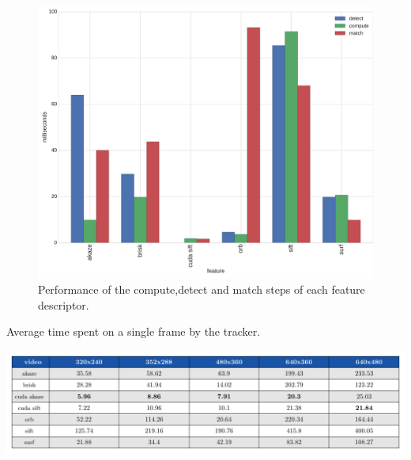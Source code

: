\begin{figure}
	\includegraphics[width=0.95\linewidth]{imgs/performances.pdf}
\vspace{-2.5mm}	
\caption{Performance of the compute,detect and match steps of each feature descriptor.}
\label{fig:speed}
\end{figure}

\begin{table}
\caption{Average time spent on a single frame by the tracker.}
	\includegraphics[width=0.95\linewidth]{tables/resolution_times.pdf}
\vspace{-2.5mm}	
\label{fig:fps}
\end{table}

